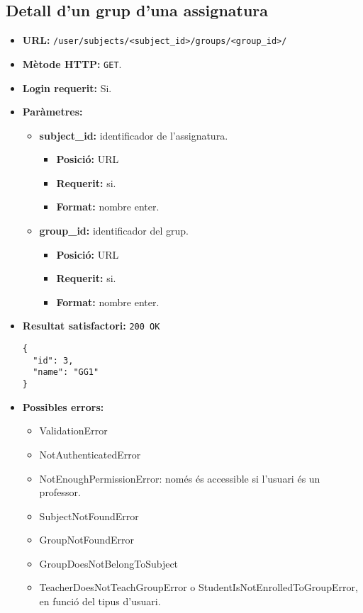 \subsection{Detall d'un grup d'una assignatura}
\begin{itemize}
\item \textbf{\ac{URL}:} \texttt{/user/subjects/<subject\_id>/groups/<group\_id>/}
\item \textbf{Mètode \ac{HTTP}: } \texttt{GET}.
\item \textbf{Login requerit:} Si.
\item \textbf{Paràmetres:}
	\begin{itemize}
		\item \textbf{subject\_id:} identificador de l'assignatura.
		\begin{itemize}
			\item \textbf{Posició:} \ac{URL}
			\item \textbf{Requerit:} si.
			\item \textbf{Format:} nombre enter.
		\end{itemize}
		\item \textbf{group\_id:} identificador del grup.
		\begin{itemize}
			\item \textbf{Posició:} \ac{URL}
			\item \textbf{Requerit:} si.
			\item \textbf{Format:} nombre enter.
		\end{itemize}
	\end{itemize}

\item \textbf{Resultat satisfactori:} \texttt{200 OK}
	\begin{verbatim}
{
  "id": 3,
  "name": "GG1"
}
	\end{verbatim}
	
	
\item \textbf{Possibles errors:}
	\begin{itemize}
		\item ValidationError
		\item NotAuthenticatedError
		\item NotEnoughPermissionError: només és accessible si l'usuari és un professor.
		\item SubjectNotFoundError
		\item GroupNotFoundError
		\item GroupDoesNotBelongToSubject
		\item TeacherDoesNotTeachGroupError o StudentIsNotEnrolledToGroupError, en funció del tipus d'usuari.
	\end{itemize}
\end{itemize}

